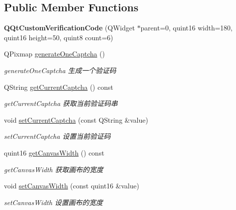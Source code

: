 \subsection*{Public Member Functions}
\begin{DoxyCompactItemize}
\item 
\mbox{\label{class_q_qt_custom_verification_code_abae25f1490e55082df196cde30d83d73}} 
{\bfseries Q\+Qt\+Custom\+Verification\+Code} (Q\+Widget $\ast$parent=0, quint16 width=180, quint16 height=50, quint8 count=6)
\item 
Q\+Pixmap \mbox{\hyperlink{class_q_qt_custom_verification_code_a033f0fe414236d0bce2a5d91911be711}{generate\+One\+Captcha}} ()
\begin{DoxyCompactList}\small\item\em generate\+One\+Captcha 生成一个验证码 \end{DoxyCompactList}\item 
Q\+String \mbox{\hyperlink{class_q_qt_custom_verification_code_ad6540b4058bef47ba80b1e850bbe3bdb}{get\+Current\+Captcha}} () const
\begin{DoxyCompactList}\small\item\em get\+Current\+Captcha 获取当前验证码串 \end{DoxyCompactList}\item 
void \mbox{\hyperlink{class_q_qt_custom_verification_code_afd853478580805ed8a898475c56264cf}{set\+Current\+Captcha}} (const Q\+String \&value)
\begin{DoxyCompactList}\small\item\em set\+Current\+Captcha 设置当前验证码 \end{DoxyCompactList}\item 
quint16 \mbox{\hyperlink{class_q_qt_custom_verification_code_a3c2d9a7d3ed45a34221d5aa3c34ff298}{get\+Canvas\+Width}} () const
\begin{DoxyCompactList}\small\item\em get\+Canvas\+Width 获取画布的宽度 \end{DoxyCompactList}\item 
void \mbox{\hyperlink{class_q_qt_custom_verification_code_ab1e673bff70db1224ade11a3c6e0b54b}{set\+Canvas\+Width}} (const quint16 \&value)
\begin{DoxyCompactList}\small\item\em set\+Canvas\+Width 设置画布的宽度 \end{DoxyCompactList}\item 

\end{DoxyCompactItemize}
